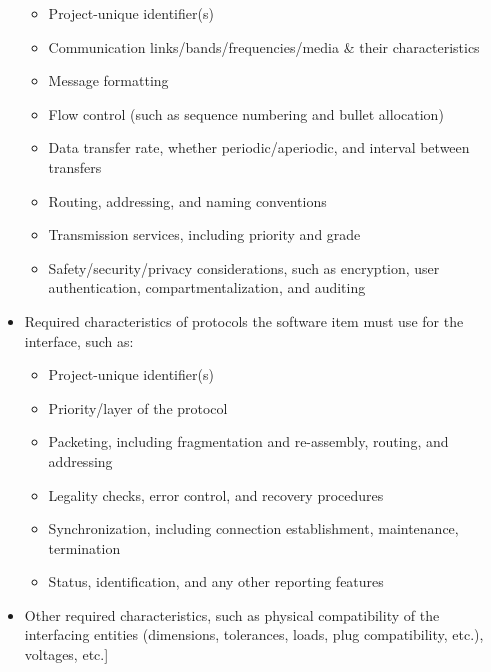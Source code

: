 \begin{itemize}
\begin{itemize}
\item Project-unique identifier(s)

\item Communication links/bands/frequencies/media \& their characteristics

\item Message formatting

\item Flow control (such as sequence numbering and bullet allocation)

\item Data transfer rate, whether periodic/aperiodic, and interval between transfers

\item Routing, addressing, and naming conventions

\item Transmission services, including priority and grade

\item Safety/security/privacy considerations, such as encryption, user authentication, compartmentalization, and auditing

\end{itemize}
\item Required characteristics of protocols the software item must use for the interface, such as:

\begin{itemize}
\item Project-unique identifier(s)

\item Priority/layer of the protocol

\item Packeting, including fragmentation and re-assembly, routing, and addressing

\item Legality checks, error control, and recovery procedures

\item Synchronization, including connection establishment, maintenance, termination

\item Status, identification, and any other reporting features

\end{itemize}
\item Other required characteristics, such as physical compatibility of the interfacing entities (dimensions, tolerances, loads, plug compatibility, etc.), voltages, etc.]

\end{itemize}
